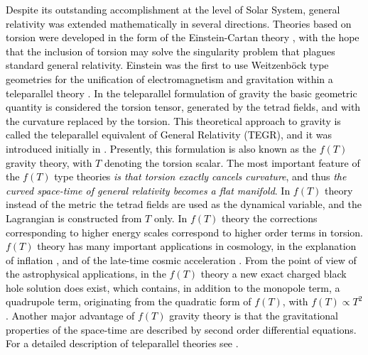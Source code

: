 \documentclass[aps,superscriptaddress, showpacs,preprintnumbers, superscriptaddress, nofootinbibt,twocolumn]{revtex4}
\newcommand{\te}[1]{\textcolor{black}{#1}}
\begin{document}
\te{Despite its outstanding accomplishment at the level of Solar System, general relativity was extended mathematically in several directions. Theories based on torsion were developed in the form of the Einstein-Cartan theory \cite{Hehl}, with the hope that the inclusion of torsion may solve the singularity problem that plagues standard general relativity.  Einstein was the first to use Weitzenb\"{o}ck type geometries for the
 unification of electromagnetism and  gravitation within a teleparallel theory \cite{TE1}.
In the teleparallel formulation of gravity the basic geometric quantity is considered the torsion tensor, generated by the tetrad fields,
and  with the curvature replaced by the torsion. This theoretical approach to gravity is called
the teleparallel equivalent of General
Relativity (TEGR), and it was introduced initially in \cite{TE2,TE3,TE4}. Presently, this formulation is also known as the $f(T)$ gravity
theory, with $T$ denoting the torsion scalar. The most important feature
of the $f(T)$ type theories {\it is that torsion exactly cancels curvature}, and thus
{\it the curved space-time of general relativity becomes a flat manifold}. In $f(T)$ theory instead of the metric the
tetrad fields are used as the dynamical variable, and the Lagrangian is constructed from $T$ only. In $f(T)$ theory the corrections corresponding to higher energy scales correspond to higher order terms in torsion. $f(T )$ theory has many important applications in cosmology, in the explanation of inflation \cite{TE4a}, and of the late-time cosmic acceleration \cite{TE4b}. From the point of view of the astrophysical applications, in the $f(T )$ theory a new exact charged black hole solution does exist, which contains, in addition to the monopole term, a quadrupole term, originating from the quadratic form of $f(T )$, with $f(T)\propto T^2$ \cite{TE4c}. Another major advantage of $f(T)$ gravity theory is that the
gravitational properties of the space-time are described by second order differential equations. For a detailed description of teleparallel
theories see \cite{TE5}.}
\end{document}
